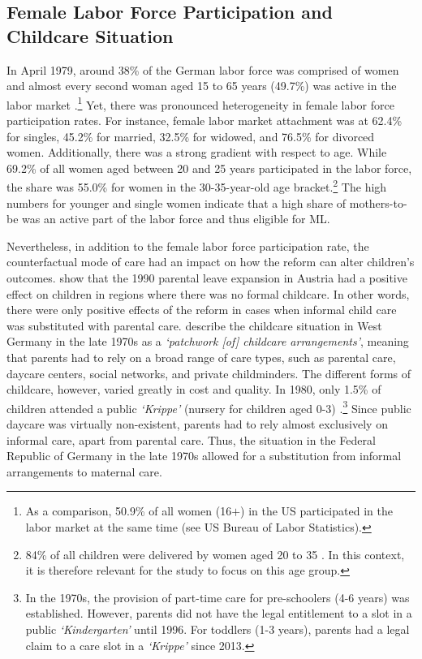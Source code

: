 \bigskip
\subsection{Female Labor Force Participation and Childcare Situation}
In April 1979, around 38\% of the German labor force was comprised of women and almost every second woman aged 15 to 65 years (49.7\%) was active in the labor market \citep{federalstatisticaloffice1981yearbook}.\footnote{As a comparison, 50.9\% of all women (16$+$) in the US participated in the labor market at the same time (see US Bureau of Labor Statistics).} Yet, there was pronounced heterogeneity in female labor force participation rates. For instance, female labor market attachment was at 62.4\% for singles, 45.2\% for married, 32.5\% for widowed, and 76.5\% for divorced women. Additionally, there was a strong gradient with respect to age. While 69.2\% of all women aged between 20 and 25 years participated in the labor force, the share was 55.0\% for women in the 30-35-year-old age bracket.\footnote{84\% of all children were delivered by women aged 20 to 35 \citep{federalstatisticaloffice1981yearbook}. In this context, it is therefore relevant for the study to focus on this age group.} The high numbers for younger and single women indicate that a high share of mothers-to-be was an active part of the labor force and thus eligible for ML.

Nevertheless, in addition to the female labor force participation rate, the counterfactual mode of care had an impact on how the reform can alter children's outcomes. \cite{danzer2019parental} show that the 1990 parental leave expansion in Austria had a positive effect on children in regions where there was no formal childcare. In other words, there were only positive effects of the reform in cases when informal child care was substituted with parental care. \cite{hank2001childcare} describe the childcare situation in West Germany in the late 1970s as a \textit{`patchwork [of] childcare arrangements'}, meaning that parents had to rely on a broad range of care types, such as parental care, daycare centers, social networks, and private childminders. The different forms of childcare, however, varied greatly in cost and quality. In 1980, only 1.5\% of children attended a public \textit{`Krippe'} (nursery for children aged 0-3) \citep[p.~34]{bildungsbericht2006}.\footnote{In the 1970s, the provision of part-time care for pre-schoolers (4-6 years) was established. However, parents did not have the legal entitlement to a slot in a public \textit{`Kindergarten'} until 1996. For toddlers (1-3 years), parents had a legal claim to a care slot in a \textit{`Krippe'} since 2013.} Since public daycare was virtually non-existent, parents had to rely almost exclusively on informal care, apart from parental care. Thus, the situation in the Federal Republic of Germany in the late 1970s allowed for a substitution from informal arrangements to maternal care. 

